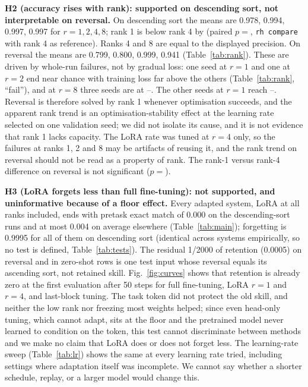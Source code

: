 \textbf{H2 (accuracy rises with rank): supported on descending sort, not interpretable on reversal.} On descending sort the means are 0.978, 0.994, 0.997, 0.997 for $r=1,2,4,8$; rank 1 is below rank 4 by  (paired $p=$, \texttt{rh compare} with rank 4 as reference). Ranks 4 and 8 are equal to the displayed precision. On reversal the means are 0.799, 0.800, 0.999, 0.941 (Table~\ref{tab:rank}). These are driven by whole-run failures, not by gradual loss: one seed at $r=1$ and one at $r=2$ end near chance with training loss far above the others (Table~\ref{tab:rank}, ``fail''), and at $r=8$ three seeds are at --. The other seeds at $r=1$ reach --. Reversal is therefore solved by rank 1 whenever optimisation succeeds, and the apparent rank trend is an optimisation-stability effect at the learning rate selected on one validation seed; we did not isolate its cause, and it is not evidence that rank 1 lacks capacity. The LoRA rate was tuned at $r=4$ only, so the failures at ranks 1, 2 and 8 may be artifacts of reusing it, and the rank trend on reversal should not be read as a property of rank. The rank-1 versus rank-4 difference on reversal is not significant ($p=$).

\textbf{H3 (LoRA forgets less than full fine-tuning): not supported, and uninformative because of a floor effect.} Every adapted system, LoRA at all ranks included, ends with pretask exact match of 0.000 on the descending-sort runs and at most 0.004 on average elsewhere (Table~\ref{tab:main}); forgetting is 0.9995 for all of them on descending sort (identical across systems empirically, so no test is defined, Table~\ref{tab:tests}). The residual 1/2000 of retention (0.0005) on reversal and in zero-shot rows is one test input whose reversal equals its ascending sort, not retained skill. Fig.~\ref{fig:curves} shows that retention is already zero at the first evaluation after 50 steps for full fine-tuning, LoRA $r=1$ and $r=4$, and last-block tuning. The task token did not protect the old skill, and neither the low rank nor freezing most weights helped; since even head-only tuning, which cannot adapt, sits at the floor and the pretrained model never learned to condition on the token, this test cannot discriminate between methods and we make no claim that LoRA does or does not forget less. The learning-rate sweep (Table~\ref{tab:lr}) shows the same at every learning rate tried, including settings where adaptation itself was incomplete. We cannot say whether a shorter schedule, replay, or a larger model would change this.

